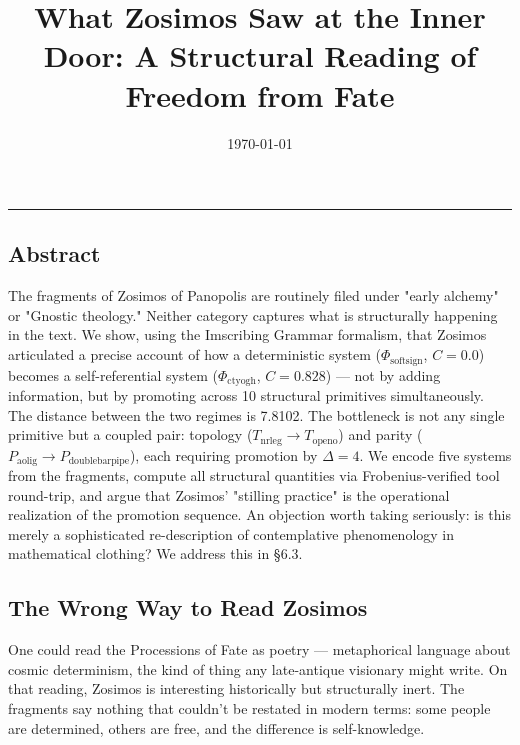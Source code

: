 \documentclass[12pt,a4paper]{article}
\newcommand{\pilcrow}{\S}
\begin{document}
\title{What Zosimos Saw at the Inner Door: A Structural Reading of Freedom from Fate}
\date{\today}

\maketitle

\begin{center}
\rule{0.5\textwidth}{0.4pt}
\end{center}

\subsection{Abstract}

The fragments of Zosimos of Panopolis are routinely filed under "early alchemy" or "Gnostic theology." Neither category captures what is structurally happening in the text. We show, using the Imscribing Grammar formalism, that Zosimos articulated a precise account of how a deterministic system ($\Phi_{\text{softsign}}$, $C = 0.0$) becomes a self-referential system ($\Phi_{\text{ctyogh}}$, $C = 0.828$) --- not by adding information, but by promoting across 10 structural primitives simultaneously. The distance between the two regimes is 7.8102. The bottleneck is not any single primitive but a coupled pair: topology ($T_{\text{nrleg}} \to T_{\text{openo}}$) and parity ($P_{\text{aolig}} \to P_{\text{doublebarpipe}}$), each requiring promotion by $\Delta = 4$. We encode five systems from the fragments, compute all structural quantities via Frobenius-verified tool round-trip, and argue that Zosimos' "stilling practice" is the operational realization of the promotion sequence. An objection worth taking seriously: is this merely a sophisticated re-description of contemplative phenomenology in mathematical clothing? We address this in \pilcrow{}6.3.

\subsection{The Wrong Way to Read Zosimos}

One could read the Processions of Fate as poetry --- metaphorical language about cosmic determinism, the kind of thing any late-antique visionary might write. On that reading, Zosimos is interesting historically but structurally inert. The fragments say nothing that couldn't be restated in modern terms: some people are determined, others are free, and the difference is self-knowledge.
\end{document}
